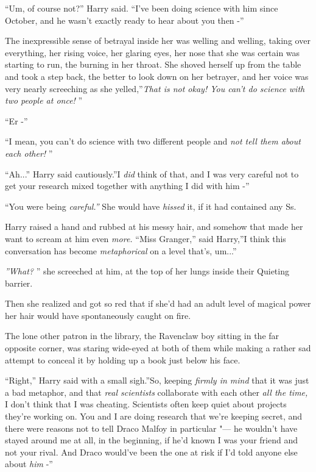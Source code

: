 ``Um, of course not?'' Harry said. ``I've been doing science with him
since October, and he wasn't exactly ready to hear about you then -''

The inexpressible sense of betrayal inside her was welling and welling,
taking over everything, her rising voice, her glaring eyes, her nose
that she was certain was starting to run, the burning in her throat. She
shoved herself up from the table and took a step back, the better to
look down on her betrayer, and her voice was very nearly screeching as
she yelled,''\emph{That is not okay! You can't do science with two
people at once!} ''

``Er -''

``I mean, you can't do science with two different people and \emph{not
tell them about each other!} ''

``Ah...'' Harry said cautiously.''I \emph{did} think of that, and I
was very careful not to get your research mixed together with anything I
did with him -''

``You were being \emph{careful.''} She would have \emph{hissed} it, if it
had contained any Ss.

Harry raised a hand and rubbed at his messy hair, and somehow that made
her want to scream at him even \emph{more.} ``Miss Granger,'' said
Harry,''I think this conversation has become \emph{metaphorical} on a
level that's, um...''

\emph{''What?} '' she screeched at him, at the top of her lungs inside
their Quieting barrier.

Then she realized and got so red that if she'd had an adult level of
magical power her hair would have spontaneously caught on fire.

The lone other patron in the library, the Ravenclaw boy sitting in the
far opposite corner, was staring wide-eyed at both of them while making
a rather sad attempt to conceal it by holding up a book just below his
face.

``Right,'' Harry said with a small sigh.''So, keeping \emph{firmly in
mind} that it was just a bad metaphor, and that \emph{real scientists}
collaborate with each other \emph{all the time,} I don't think that I
was cheating. Scientists often keep quiet about projects they're working
on. You and I are doing research that we're keeping secret, and there
were reasons not to tell Draco Malfoy in particular "--- he wouldn't have
stayed around me at all, in the beginning, if he'd known I was your
friend and not your rival. And Draco would've been the one at risk if
I'd told anyone else about \emph{him} -''

